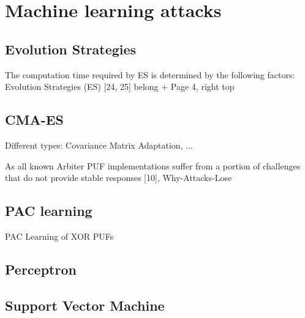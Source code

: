 \chapter{Machine learning attacks}
\label{cap:mla}

\section{Evolution Strategies}
\label{sec:evolutionstrategies}

The computation time required by ES is determined by the following factors: \cite{Ruhrmair2013PUFData}
Evolution Strategies (ES) [24, 25] belong \cite{Ruhrmair2010ModelingFunctions} + Page 4, right top

\cite{Hansen2006TheReview}
\cite{Delvaux2013SideNoise}


\section{CMA-ES}
\label{sec:cma-es}
Different types: Covariance Matrix Adaptation, ...

\cite{Hansen2006TheReview}
\cite{Delvaux2013SideNoise}

As all known Arbiter PUF implementations suffer from a portion of challenges that do not provide stable responses [10], Why-Attacks-Lose


\section{PAC learning}
\label{PAC learning}

PAC Learning of XOR PUFs \cite{Ganji2015WhyPUFs}


\section{Perceptron}
\label{sec:perceptron}


\section{Support Vector Machine}
\label{sec:svm}

